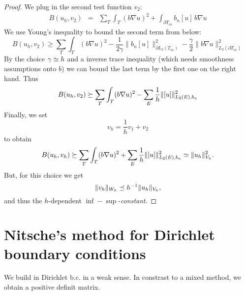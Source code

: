 \begin{proof}
We plug in the second test function $v_2$:
\begin{eqnarray*}
B(u_h, v_2) & = & \sum_T \int_T (b \nabla u)^2 +
                  \int_{\partial {T_{in}}} b_n [u] \, b \nabla u 
\end{eqnarray*}
We use Young's inequality to bound the second term from below:
$$
B(u_h, v_2) \geq \sum_T \int_T (b \nabla u)^2 - \frac{1}{2
  \gamma} \| b_n  [u] \|^2_{\partial L_2(T_{in})} - \frac{\gamma}{2}  \| b
\nabla u\|_{L_2(\partial T_{in})}^2
$$
By the choice $\gamma \simeq h$ and a inverse trace inequality (which
needs smoothness assumptions onto $b$) we can bound the last term by the first
one on the right hand. Thus
$$
B(u_h, v_2) \succeq \sum_T \int_T (b \nabla u)^2 - \sum_E \frac{1}{h}  \| [u] \|^2_{L_2(E),b_n} 
$$
Finally, we set
$$
v_h = \frac{1}{h}  v_1 + v_2
$$
to obtain 
$$
B(u_h, v_h)  \succeq   \sum_T \int_T (b \nabla u)^2 + \sum_E \frac{1}{h}
\| [u] \|^2_{L_2(E),b_n}    \simeq  \| u_h \|^2_{V_h}.
$$
But, for this choice we get
$$
\| v_h \|_{W_h} \preceq h^{-1} \| u_h \|_{V_h},
$$
and thus the $h$-dependent $\inf-\sup$-{\it constant}.
\end{proof}

\newpage


\section{Nitsche's method for Dirichlet boundary conditions}

We build in Dirichlet b.c. in a weak sense. In constrast to a mixed
method, we obtain a positive definit matrix.

